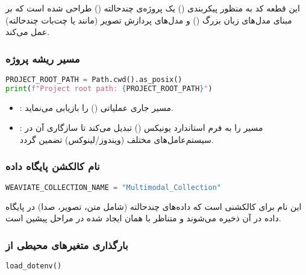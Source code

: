 \documentclass{article}
\begin{document}
این قطعه کد به منظور پیکربندی () یک پروژه‌ی چند‌حالته () طراحی شده است که بر مبنای مدل‌های زبان بزرگ () و مدل‌های پردازش تصویر (مانند  یا چت‌بات چندحالته) عمل می‌کند.

\subsubsection{مسیر ریشه پروژه}

\begin{latin}
\begin{lstlisting}[language=Python]
PROJECT_ROOT_PATH = Path.cwd().as_posix()
print(f"Project root path: {PROJECT_ROOT_PATH}")
\end{lstlisting}
\end{latin}

\begin{itemize}
    \item {}: مسیر جاری عملیاتی () را بازیابی می‌نماید.
    \item {}: مسیر را به فرم استاندارد یونیکس (\lr{/}) تبدیل می‌کند تا سازگاری آن در سیستم‌عامل‌های مختلف (ویندوز/لینوکس) تضمین گردد.
\end{itemize}

\subsubsection{نام کالکشن پایگاه داده }

\begin{latin}
\begin{lstlisting}[language=Python]
WEAVIATE_COLLECTION_NAME = "Multimodal_Collection"
\end{lstlisting}
\end{latin}

این نام برای کالکشنی است که داده‌های چندحالته (شامل متن، تصویر، صدا) در پایگاه داده  در آن ذخیره می‌شوند و متناظر با همان  ایجاد شده در مراحل پیشین است.

\subsubsection{بارگذاری متغیرهای محیطی از }

\begin{latin}
\begin{lstlisting}[language=Python]
load_dotenv()
\end{lstlisting}
\end{latin}
\end{document}
